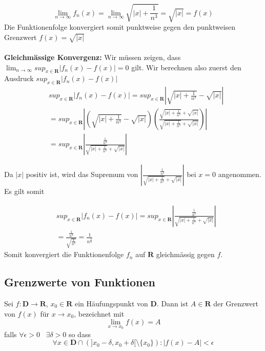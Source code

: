 \documentclass[8pt]{extarticle}
\begin{document}
\begin{multicols*}{3}
$$
\lim_{n \to \infty} f_n(x) = \lim_{n \rightarrow \infty} \sqrt{|x| + \frac{1}{n^3}} = \sqrt{|x|} = f(x)
$$
Die Funktionenfolge konvergiert somit punktweise gegen den punktweisen Grenzwert $f(x) = \sqrt{|x|}$\\
\\
\textbf{Gleichmässige Konvergenz:} Wir müssen zeigen, dass $\lim_{n \to \infty} sup_{x \in \mathbf{R}} |f_n(x) - f(x)| = 0$ gilt. Wir berechnen also zuerst den Ausdruck $sup_{x \in \mathbf{R}} |f_n(x) - f(x)|$
\begin{align*}
	&sup_{x \in \mathbf{R}} |f_n(x) - f(x)| = sup_{x \in \mathbf{R}} \left|\sqrt{|x| + \frac{1}{n^3}} - \sqrt{|x|}\right|\\
	& =  sup_{x \in \mathbf{R}} \left|\left(\sqrt{|x| + \frac{1}{n^3}} - \sqrt{|x|}\right) \left(\frac{\sqrt{|x| + \frac{1}{n^3}} + \sqrt{|x|}}{\sqrt{|x| + \frac{1}{n^3}} + \sqrt{|x|}}\right)\right| \\
	& = sup_{x \in \mathbf{R}} \left|\frac{\frac{1}{n^3}}{\sqrt{|x| + \frac{1}{n^3}} + \sqrt{|x|}}\right|
\end{align*}

Da $|x|$ positiv ist, wird das Supremum von $\left|\frac{\frac{1}{n^3}}{\sqrt{|x| + \frac{1}{n^3}} + \sqrt{|x|}}\right|$ bei $x = 0$ angenommen. Es gilt somit

\begin{align*}
 & sup_{x \in \mathbf{R}} |f_n(x) - f(x)| = sup_{x \in \mathbf{R}} \left|\frac{\frac{1}{n^3}}{\sqrt{|x| + \frac{1}{n^3}} + \sqrt{|x|}}\right|\\
  &= \frac{\frac{1}{n^3}}{\sqrt{\frac{1}{n^3}}} = \frac{1}{n^{\frac{3}{2}}}
\end{align*}
Somit konvergiert die Funktionenfolge $f_n$ auf $\mathbf{R}$ gleichmässig gegen $f$.




  \subsection {Grenzwerte von Funktionen}
Sei $f:\mathbf{D} \rightarrow \mathbf{R}$, $x_0 \in \mathbf{R}$ ein Häufungspunkt von $\mathbf{D}$.
Dann ist $A \in \mathbf{R}$ der Grenzwert von $f(x)$ für $x \rightarrow x_0$, bezeichnet mit
$$
  \lim_{x \rightarrow x_0} f(x) = A
$$
falls $\forall \epsilon > 0 \;\;\; \exists \delta > 0$ so dass
$$
  \forall x \in \mathbf{D} \cap (]x_0-\delta, x_0 + \delta[ \setminus \{x_0\}) : |f(x) - A| < \epsilon
$$

\end{multicols*}
\end{document}
